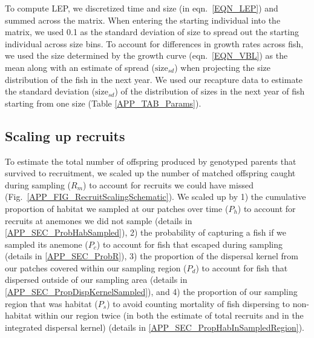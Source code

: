 \documentclass[12pt, oneside]{article}   	%
\begin{document}
To compute LEP, we discretized time and size (in eqn.\ \ref{EQN_LEP}) and summed across the matrix. When entering the starting individual into the matrix, we used 0.1 as the standard deviation of size to spread out the starting individual across size bins. To account for differences in growth rates across fish, we used the size determined by the growth curve (eqn.\ \ref{EQN_VBL}) as the mean along with an estimate of spread ($\text{size}_{sd}$) when projecting the size distribution of the fish in the next year. We used our recapture data to estimate the standard deviation ($\text{size}_{sd}$) of the distribution of sizes in the next year of fish starting from one size (Table \ref{APP_TAB_Params}). %



\subsection{Scaling up recruits}

To estimate the total number of offspring produced by genotyped parents that survived to recruitment, we scaled up the number of matched offspring caught during sampling ($R_m$) to account for recruits we could have missed (Fig.\ \ref{APP_FIG_RecruitScalingSchematic}). We scaled up by 1) the cumulative proportion of habitat we sampled at our patches over time ($P_h$) to account for recruits at anemones we did not sample (details in \ref{APP_SEC_ProbHabSampled}), 2) the probability of capturing a fish if we sampled its anemone ($P_c$) to account for fish that escaped during sampling (details in \ref{APP_SEC_ProbR}), 3) the proportion of the dispersal kernel from our patches covered within our sampling region ($P_d$) to account for fish that dispersed outside of our sampling area (details in \ref{APP_SEC_PropDispKernelSampled}), and 4) the proportion of our sampling region that was habitat ($P_s$) to avoid counting mortality of fish dispersing to non-habitat within our region twice (in both the estimate of total recruits and in the integrated dispersal kernel) (details in \ref{APP_SEC_PropHabInSampledRegion}). %
\end{document}
